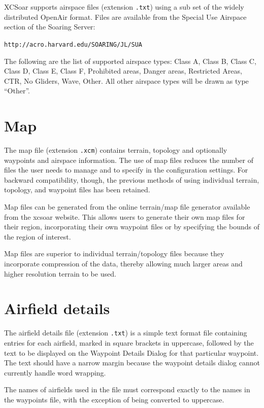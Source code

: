 \documentclass[a4paper,12pt]{refrep}
\begin{document}
XCSoar supports airspace files (extension \verb|.txt|) using a sub set
of the widely distributed OpenAir format. Files are available from the
Special Use Airspace section of the Soaring Server:

\verb|http://acro.harvard.edu/SOARING/JL/SUA|

The following are the list of supported airspace types: Class A, Class
B, Class C, Class D, Class E, Class F, Prohibited areas, Danger areas,
Restricted Areas, CTR, No Gliders, Wave, Other.  All other airspace
types will be drawn as type ``Other''.

\section{Map}\label{sec:map}

The map file (extension \verb|.xcm|) contains terrain, topology and
optionally waypoints and airspace information.  The use of map files
reduces the number of files the user needs to manage and to specify in
the configuration settings.  For backward compatibility, though, the
previous methods of using individual terrain, topology, and waypoint
files has been retained.

Map files can be generated from the online terrain/map file generator
available from the xcsoar website.  This allows users to generate
their own map files for their region, incorporating their own waypoint
files or by specifying the bounds of the region of interest.

Map files are superior to individual terrain/topology files because
they incorporate compression of the data, thereby allowing much larger
areas and higher resolution terrain to be used.

\section{Airfield details}

The airfield details file (extension \verb|.txt|) is a simple text
format file containing entries for each airfield, marked in square
brackets in uppercase, followed by the text to be displayed on the
Waypoint Details Dialog for that particular waypoint.  The text should
have a narrow margin because the waypoint details dialog cannot
currently handle word wrapping.

The names of airfields used in the file must correspond exactly to the
names in the waypoints file, with the exception of being converted to
uppercase.
\end{document}
